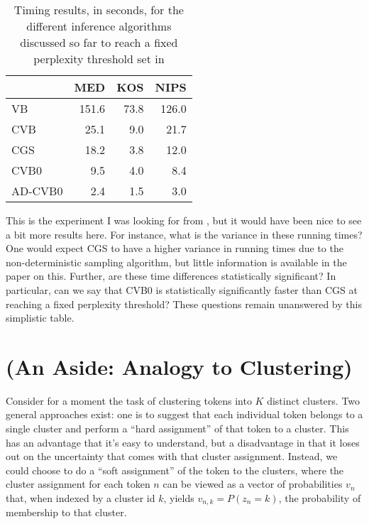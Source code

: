 \documentclass[11pt]{article}
\begin{document}
\begin{table}[h]
  \begin{center}
    \begin{tabular}{l|r|r|r}
      & \textbf{MED} & \textbf{KOS} & \textbf{NIPS}\\\hline
      VB & 151.6 & 73.8 & 126.0\\
      CVB & 25.1 & 9.0 & 21.7\\
      CGS & 18.2 & 3.8 & 12.0\\
      CVB0 & 9.5 & 4.0 & 8.4\\
      AD-CVB0 & 2.4 & 1.5 & 3.0\\
    \end{tabular}
  \end{center}
  \caption{Timing results, in seconds, for the different inference algorithms discussed
    so far to reach a fixed perplexity threshold set
    in \citet{Asuncion:2009:onsmoothing}}
  \label{table:cvb0time}
\end{table}

This is the experiment I was looking for from \citet{Teh:2007:CVB}, but it
would have been nice to see a bit more results here. For instance, what is
the variance in these running times? One would expect CGS to have a higher
variance in running times due to the non-deterministic sampling algorithm,
but little information is available in the paper on this. Further, are
these time differences statistically significant? In particular, can we say
that CVB0 is statistically significantly faster than CGS at reaching a
fixed perplexity threshold? These questions remain unanswered by this
simplistic table.

\section{(An Aside: Analogy to Clustering)}

Consider for a moment the task of clustering tokens into $K$ distinct
clusters. Two general approaches exist: one is to suggest that each
individual token belongs to a single cluster and perform a ``hard
assignment'' of that token to a cluster. This has an advantage that it's
easy to understand, but a disadvantage in that it loses out on the
uncertainty that comes with that cluster assignment. Instead, we could
choose to do a ``soft assignment'' of the token to the clusters, where the
cluster assignment for each token $n$ can be viewed as a vector of
probabilities $v_n$ that, when indexed by a cluster id $k$, yields
$v_{n,k} = P(z_n = k)$, the probability of membership to that cluster.
\end{document}
